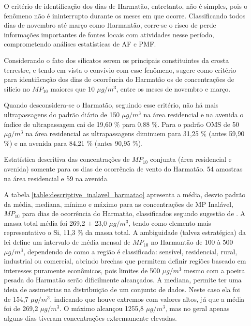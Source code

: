 O critério de identificação dos dias de Harmatão, entretanto, não é simples, 
pois o fenômeno não é ininterrupto durante os meses em que ocorre. 
Classificando todos dias de novembro até março como Harmantão, corre-se o risco 
de perde informações importantes de fontes locais com atividades nesse período, 
comprometendo análises estatísticas de AF e PMF. 

Considerando o fato dos silicatos serem os principais constituintes da crosta
terrestre, e tendo em vista o convívio com esse fenômeno, \citet{aboh2009} 
sugere como critério para identificação dos dias de ocorrência do Harmatão os de
concentrações de silício no $MP_{10}$ maiores que 10 $\mu g/m^3$, entre os meses
de novembro e março. 

Quando desconsidera-se o Harmatão, seguindo esse critério,
não há mais ultrapassagens do padrão diário de 150 $\mu g / m^3$ na área 
residencial e na avenida o índice de ultrapassagem cai de 19,60 \% para 0,88 \%. 
Para o padrão OMS de 50 $\mu g / m^3$ na área residencial as 
ultrapassagens diminuem para 31,25 \% (antes 59,90 \%) e na avenida para 
84,21 \% (antes 90,95 \%).

\begin{table}[H]
  \centering
  
  \caption{Estatística descritiva das concentrações de $MP_{10}$ conjunta
           (área residencial e avenida) somente para os dias de ocorrência 
           de vento do Harmatão. 54 amostras na área residencial e 59 na avenida 
          \label{table:descriptive_inalavel_harmatao}}
\end{table}

A tabela \ref{table:descriptive_inalavel_harmatao} apresenta a média, 
desvio padrão da média, mediana, mínimo e máximo para as concentrações de 
MP Inalável, $MP_{10}$ para dias de ocorrência do Harmatão, classificados
segundo sugestão de \citet{aboh2009}. A massa total média foi 269,2 $\pm$ 23,0
$\mu g/ m^3$, tendo como elemento mais representativo o Si, 11,3 \% da massa total. 
A ambiguidade (talvez estratégica) da lei define um intervalo de média mensal 
de $MP_{10}$ no Harmantão de 100 à 500 $\mu g/ m^3$, dependendo de como a região
é classificada: sensível, residencial, rural, industrial ou comercial, abrindo
brechas que permitem definir regiões baseado em interesses puramente econômicos,
pois limites de 500 $\mu g/ m^3$ mesmo com a poeira pesada do Harmatão serão
dificilmente alcançados. A mediana, permite ter uma ideia de assimetrias na 
distribuição de um conjunto de dados. Neste caso ela foi de 154,7 $\mu g/ m^3$, 
indicando que houve extremos com valores altos, já que a média foi de 
269,2 $\mu g/ m^3$. O máximo alcançou 1255,8 $\mu g/ m^3$, mas no geral apenas 
alguns dias tiveram concentrações extremamente elevadas. %


